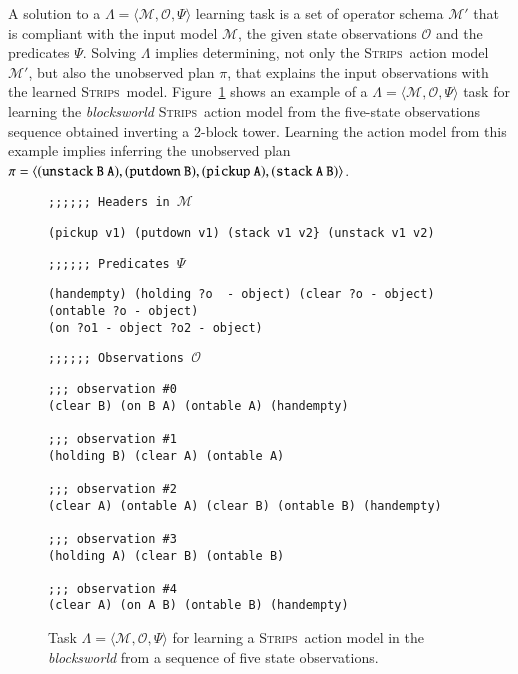 \documentclass[3p,times]{elsarticle}
\newcommand{\strips}{\textsc{Strips}}     %
\newcommand{\tup}[1]{{\langle #1 \rangle}}
\begin{document}
A solution to a $\Lambda=\tup{\mathcal{M},\mathcal{O},\Psi}$ learning task is a set of operator schema $\mathcal{M}'$ that is compliant with the input model $\mathcal{M}$, the given state observations $\mathcal{O}$ and the predicates $\Psi$. Solving $\Lambda$ implies determining, not only the \strips\ action model $\mathcal{M}'$, but also the unobserved plan $\pi$, that explains the input observations with the learned \strips\ model. Figure~\ref{fig:example-observations} shows an example of a $\Lambda=\tup{\mathcal{M},\mathcal{O},\Psi}$ task for learning the {\em blocksworld} \strips\ action model from the five-state observations sequence obtained inverting a 2-block tower. Learning the action model from this example implies inferring the unobserved plan $\pi=\tup{\small\tt (unstack\ B\ A), (putdown\ B), (pickup\ A), (stack\ A\ B)}$.

\begin{figure}[hbt!]
{\footnotesize\tt ;;;;;; Headers in $\mathcal{M}$}
\begin{footnotesize}
\begin{verbatim}
(pickup v1) (putdown v1) (stack v1 v2} (unstack v1 v2)
\end{verbatim}
\end{footnotesize}
\vspace{0.2cm}
{\footnotesize\tt ;;;;;; Predicates $\Psi$}
\begin{footnotesize}
\begin{verbatim}
(handempty) (holding ?o  - object) (clear ?o - object) (ontable ?o - object)
(on ?o1 - object ?o2 - object)
\end{verbatim}
\end{footnotesize}
\vspace{0.2cm}
{\footnotesize\tt ;;;;;; Observations $\mathcal{O}$}
\begin{footnotesize}
\begin{verbatim}
;;; observation #0
(clear B) (on B A) (ontable A) (handempty)

;;; observation #1
(holding B) (clear A) (ontable A)

;;; observation #2
(clear A) (ontable A) (clear B) (ontable B) (handempty)

;;; observation #3
(holding A) (clear B) (ontable B)

;;; observation #4
(clear A) (on A B) (ontable B) (handempty)
\end{verbatim}
\end{footnotesize}
 \caption{\small Task $\Lambda=\tup{\mathcal{M},\mathcal{O},\Psi}$ for learning a \strips\ action model in the {\em blocksworld} from a sequence of five state observations.}
\label{fig:example-observations}
\end{figure}
\end{document}
